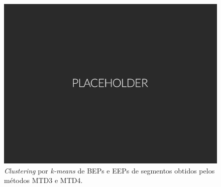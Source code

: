\begin{figure}[htb]
	\caption{\label{fig:kmeans2}\emph{Clustering} por \emph{k-means} de BEPs e EEPs de segmentos obtidos pelos métodos MTD3 e MTD4.}
	\begin{center}
	    \includegraphics[width=0.75\linewidth]{./img/placeholder.png}
	\end{center}
\end{figure}
